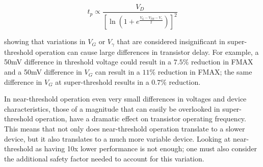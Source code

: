 \begin{equation}
\label{eqn:nth_delay}
t_p\propto\frac{V_D}{\left[\ln\left(1+e^\frac{V_G-V_{TH}-V_\gamma}{2}\right)\right]^2}
\end{equation}
 
 showing that variations in $V_G$ or $V_\gamma$ that are considered insignificant in super-threshold operation can cause large differences in transistor delay.
For example, a 50mV difference in threshold voltage could result in a $7.5\%$ reduction in FMAX and a 50mV difference in $V_G$ can result in a $11\%$ reduction in FMAX; the same difference in $V_G$ at super-threshold results in a $0.7\%$ reduction.

In near-threshold operation even very small differences in voltages and device characteristics, those of a magnitude that can easily be overlooked in super-threshold operation, have a dramatic effect on transistor operating frequency. 
This means that not only does near-threshold operation translate to a slower device, but it also translates to a much more variable device.
Looking at near-threshold as having 10x lower performance is not enough; one must also consider the additional safety factor needed to account for this variation.